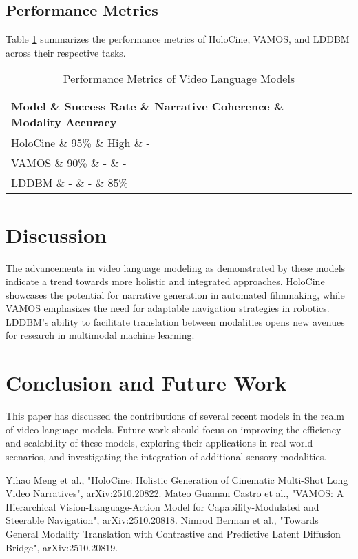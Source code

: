 \documentclass{article}
\begin{document}
\subsection{Performance Metrics}
Table \ref{tab:performance} summarizes the performance metrics of HoloCine, VAMOS, and LDDBM across their respective tasks.
\begin{table}[h]
\centering
\caption{Performance Metrics of Video Language Models}
\begin{tabular}{lccc}
\toprule
Model \& Success Rate \& Narrative Coherence \& Modality Accuracy \\
\midrule
HoloCine \& 95\% \& High \& - \\
VAMOS \& 90\% \& - \& - \\
LDDBM \& - \& - \& 85\% \\
\bottomrule
\end{tabular}
\label{tab:performance}
\end{table}

\section{Discussion}
The advancements in video language modeling as demonstrated by these models indicate a trend towards more holistic and integrated approaches. HoloCine showcases the potential for narrative generation in automated filmmaking, while VAMOS emphasizes the need for adaptable navigation strategies in robotics. LDDBM's ability to facilitate translation between modalities opens new avenues for research in multimodal machine learning.

\section{Conclusion and Future Work}
This paper has discussed the contributions of several recent models in the realm of video language models. Future work should focus on improving the efficiency and scalability of these models, exploring their applications in real-world scenarios, and investigating the integration of additional sensory modalities.

\begin{thebibliography}{9}
 Yihao Meng et al., "HoloCine: Holistic Generation of Cinematic Multi-Shot Long Video Narratives", arXiv:2510.20822.
 Mateo Guaman Castro et al., "VAMOS: A Hierarchical Vision-Language-Action Model for Capability-Modulated and Steerable Navigation", arXiv:2510.20818.
 Nimrod Berman et al., "Towards General Modality Translation with Contrastive and Predictive Latent Diffusion Bridge", arXiv:2510.20819.
\end{thebibliography}
\end{document}
